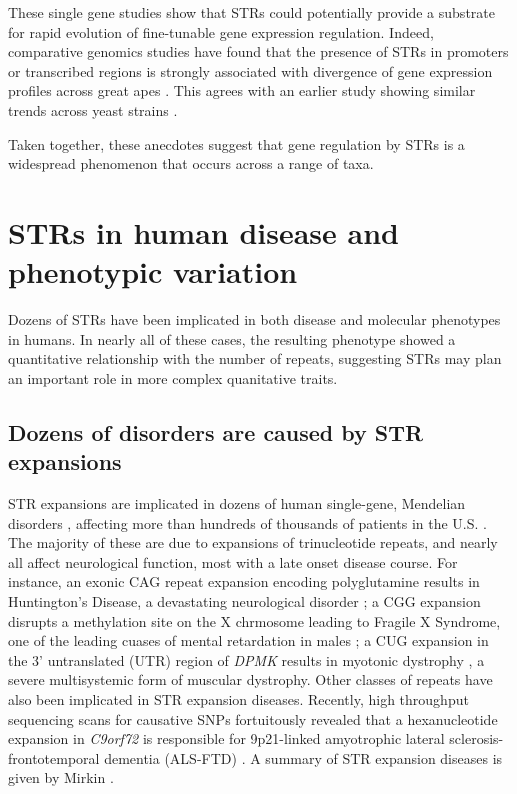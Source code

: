 These single gene studies show that STRs could potentially provide a substrate for rapid evolution of fine-tunable gene expression regulation. Indeed, comparative genomics studies have found that the presence of STRs in promoters or transcribed regions is strongly associated with divergence of gene expression profiles across great apes \cite{SonayCarvalhoRobinsonEtAl2015}. This agrees with an earlier study showing similar trends across yeast strains \cite{VincesLegendreCaldaraEtAl2009}. 

Taken together, these anecdotes suggest that gene regulation by STRs is a widespread phenomenon that occurs across a range of taxa.

\section{STRs in human disease and phenotypic variation}
Dozens of STRs have been implicated in both disease and molecular phenotypes in humans. In nearly all of these cases, the resulting phenotype showed a quantitative relationship with the number of repeats, suggesting STRs may plan an important role in more complex quanitative traits.

\subsection{Dozens of disorders are caused by STR expansions}
STR expansions are implicated in dozens of human single-gene, Mendelian disorders \cite{Mirkin2007}, affecting more than hundreds of thousands of patients in the U.S. \cite{CoffeeKeithAlbizuaEtAl2009}. The majority of these are due to expansions of trinucleotide repeats, and nearly all affect neurological function, most with a late onset disease course. For instance, an exonic CAG repeat expansion encoding polyglutamine results in Huntington's Disease, a devastating neurological disorder \cite{Mirkin2007}; a CGG expansion disrupts a methylation site on the X chrmosome leading to Fragile X Syndrome, one of the leading cuases of mental retardation in males \cite{LyonLaverYuEtAl2010}; a CUG expansion in the 3' untranslated (UTR) region of \emph{DPMK} results in myotonic dystrophy \cite{BrookMcCurrachHarleyEtAl1992}, a severe multisystemic form of muscular dystrophy. Other classes of repeats have also been implicated in STR expansion diseases. Recently, high throughput sequencing scans for causative SNPs fortuitously revealed that a hexanucleotide expansion in \emph{C9orf72} is responsible for 9p21-linked amyotrophic lateral sclerosis-frontotemporal dementia (ALS-FTD) \cite{RentonMajounieWaiteEtAl}. A summary of STR expansion diseases is given by Mirkin \cite{Mirkin2007}. %

